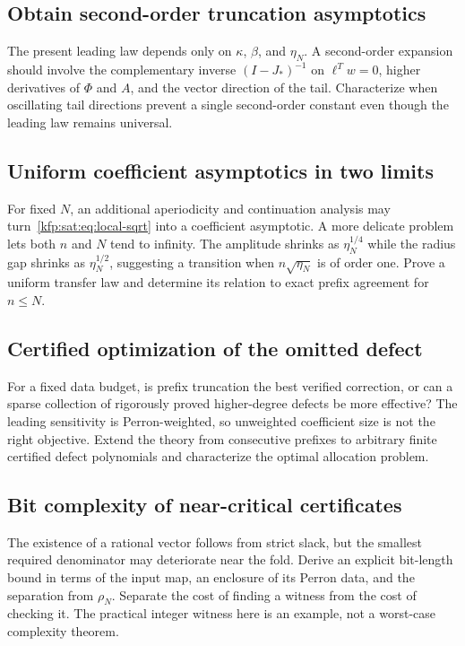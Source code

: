 \documentclass[11pt,a4paper]{article}
\theoremstyle{definition}
\theoremstyle{remark}
\begin{document}
\subsection{Obtain second-order truncation asymptotics}
The present leading law depends only on $\kappa$, $\beta$, and $\eta_N$.
A second-order expansion should involve the complementary inverse
$(I-J_*)^{-1}$ on $\ell^Tw=0$, higher derivatives of $\Phi$ and $A$,
and the vector direction of the tail. Characterize when oscillating tail
directions prevent a single second-order constant even though the leading
law remains universal.

\subsection{Uniform coefficient asymptotics in two limits}
For fixed $N$, an additional aperiodicity and continuation analysis may
turn~\eqref{kfp:sat:eq:local-sqrt} into a coefficient asymptotic. A more delicate
problem lets both $n$ and $N$ tend to infinity. The amplitude shrinks as
$\eta_N^{1/4}$ while the radius gap shrinks as $\eta_N^{1/2}$, suggesting a
transition when $n\sqrt{\eta_N}$ is of order one. Prove a uniform transfer
law and determine its relation to exact prefix agreement for $n\le N$.

\subsection{Certified optimization of the omitted defect}
For a fixed data budget, is prefix truncation the best verified correction,
or can a sparse collection of rigorously proved higher-degree defects be
more effective? The leading sensitivity is Perron-weighted, so unweighted
coefficient size is not the right objective. Extend the theory from
consecutive prefixes to arbitrary finite certified defect polynomials and
characterize the optimal allocation problem.

\subsection{Bit complexity of near-critical certificates}
The existence of a rational vector follows from strict slack, but the
smallest required denominator may deteriorate near the fold. Derive an
explicit bit-length bound in terms of the input map, an enclosure of its
Perron data, and the separation from $\rho_N$. Separate the cost of finding
a witness from the cost of checking it. The practical integer witness here
is an example, not a worst-case complexity theorem.
\end{document}
